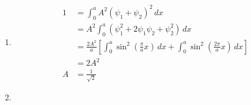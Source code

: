 \documentclass{article}
\begin{document}
\subsection{}

\begin{enumerate}
  \item

        \begin{align*}
          1 & = \int_0^a A^2 (\psi_1 + \psi_2)^2 \,d x                                                                                                       \\
            & = A^2 \int_0^a (\psi_1^2 + 2 \psi_1 \psi_2 + \psi_2^2) \,d x                                                                                   \\
            & = \frac{2 A^2}{a} \left[ \int_0^a \sin^2 \left( \frac{\pi}{a} x \right) \,d x + \int_0^a \sin^2 \left( \frac{2 \pi}{a} x \right) \,d x \right] \\
            & = 2 A^2                                                                                                                                        \\
          A & = \frac{1}{\sqrt{2}}
        \end{align*}

  \item


\end{enumerate}
\end{document}
